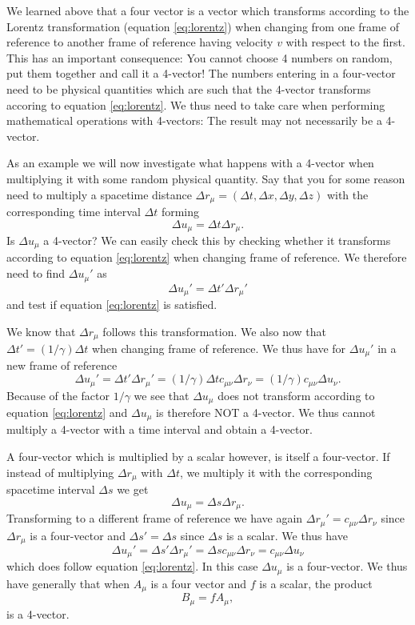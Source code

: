{\begin{multicols}{2}
We learned above that a four vector\label{pg:fourvector} is a vector which transforms according to the Lorentz transformation (equation \ref{eq:lorentz}) when changing from one frame of reference to another frame of reference having velocity $v$ with respect to the first. This has an important consequence: You cannot choose 4 numbers on random, put them together and call it a 4-vector! The numbers entering in a four-vector need to be physical quantities which are such that the 4-vector transforms accoring to equation \ref{eq:lorentz}. We thus need to take care when performing mathematical operations with 4-vectors: The result may not necessarily be a 4-vector.

As an example we will now investigate what happens with a 4-vector when multiplying it with some random physical quantity. Say that you for some reason need to multiply a spacetime distance $\Delta r_\mu=(\Delta t,\Delta x,\Delta y,\Delta z)$ with the corresponding time interval $\Delta t$ forming 
\[
\Delta u_\mu=\Delta t\Delta r_\mu.
\]
Is $\Delta u_\mu$ a 4-vector? We can easily check this by checking whether it transforms according to equation \ref{eq:lorentz} when changing frame of reference. We therefore need to find $\Delta u_\mu'$ as
\[
\Delta u_\mu'=\Delta t'\Delta r_\mu'
\]
and test if equation \ref{eq:lorentz} is satisfied.

We know that $\Delta r_\mu$ follows this transformation. We also now that $\Delta t'=(1/\gamma)\Delta t$ when changing frame of reference. We thus have for $\Delta u_\mu'$ in a new frame of reference
\[
\Delta u_\mu'=\Delta t'\Delta r_\mu'=(1/\gamma)\Delta tc_{\mu\nu}\Delta r_\nu=(1/\gamma) c_{\mu\nu}\Delta u_\nu.
\]
Because of the factor $1/\gamma$ we see that $\Delta u_\mu$ does not transform according to equation \ref{eq:lorentz} and $\Delta u_\mu$ is therefore NOT a 4-vector. We thus cannot multiply a 4-vector with a time interval and obtain a 4-vector.

A four-vector which is multiplied by a scalar however, is itself a four-vector. If instead of multiplying $\Delta r_\mu$ with $\Delta t$, we multiply it with the corresponding spacetime interval $\Delta s$ we get
\[
\Delta u_\mu=\Delta s\Delta r_\mu.
\]
Transforming to a different frame of reference we have again $\Delta r_\mu'=c_{\mu\nu}\Delta r_\nu$ since $\Delta r_\mu$ is a four-vector and $\Delta s'=\Delta s$ since $\Delta s$ is a scalar. We thus have
\[
\Delta u_\mu'=\Delta s'\Delta r_\mu'=\Delta sc_{\mu\nu}\Delta r_\nu=c_{\mu\nu}\Delta u_\nu
\]
which does follow equation \ref{eq:lorentz}. In this case $\Delta u_\mu$ is a four-vector. We thus have generally that when $A_\mu$ is a four vector and $f$ is a scalar, the product
\[
B_\mu=fA_\mu,
\]
is a 4-vector.



\end{multicols}}
